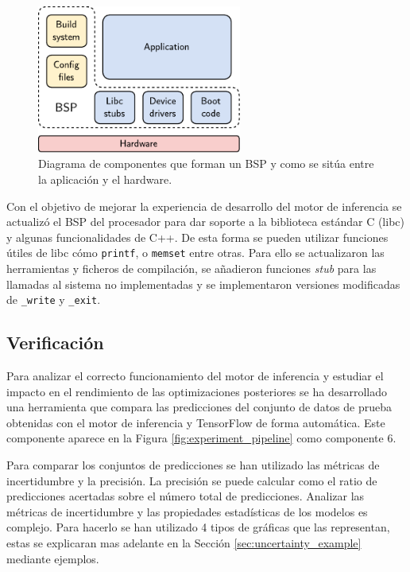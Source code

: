 \begin{figure}[h]
    \centering
    \includegraphics[width=0.6\textwidth]{root/Imagenes/metodologia/bsp.pdf}
    \caption{Diagrama de componentes que forman un BSP y como se sitúa entre la aplicación y el hardware.}
    \label{fig:bsp}
\end{figure}

Con el objetivo de mejorar la experiencia de desarrollo del motor de inferencia se actualizó el BSP del procesador para dar soporte a la biblioteca estándar C (libc) y algunas funcionalidades de C++. De esta forma se pueden utilizar funciones útiles de libc cómo \texttt{printf}, o \texttt{memset} entre otras. Para ello se actualizaron las herramientas y ficheros de compilación, se añadieron funciones \textit{stub} para las llamadas al sistema no implementadas y se implementaron versiones modificadas de \texttt{\_write} y \texttt{\_exit}.


\subsection{Verificación}

Para analizar el correcto funcionamiento del motor de inferencia y estudiar el impacto en el rendimiento de las optimizaciones posteriores se ha desarrollado una herramienta que compara las predicciones del conjunto de datos de prueba obtenidas con el motor de inferencia y TensorFlow de forma automática. Este componente aparece en la Figura \ref{fig:experiment_pipeline} como componente 6.

Para comparar los conjuntos de predicciones se han utilizado las métricas de incertidumbre y la precisión. La precisión se puede calcular como el ratio de predicciones acertadas sobre el número total de predicciones. Analizar las métricas de incertidumbre y las propiedades estadísticas de los modelos es complejo. Para hacerlo se han utilizado 4 tipos de gráficas que las representan, estas se explicaran mas adelante en la Sección \ref{sec:uncertainty_example} mediante ejemplos.

